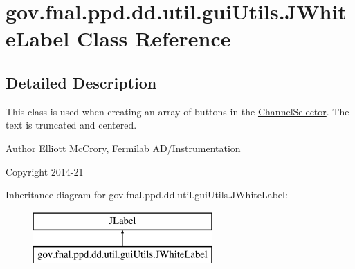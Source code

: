 \hypertarget{classgov_1_1fnal_1_1ppd_1_1dd_1_1util_1_1guiUtils_1_1JWhiteLabel}{\section{gov.\-fnal.\-ppd.\-dd.\-util.\-gui\-Utils.\-J\-White\-Label Class Reference}
\label{classgov_1_1fnal_1_1ppd_1_1dd_1_1util_1_1guiUtils_1_1JWhiteLabel}
}


\subsection{Detailed Description}
This class is used when creating an array of buttons in the \hyperlink{classgov_1_1fnal_1_1ppd_1_1dd_1_1ChannelSelector}{Channel\-Selector}. The text is truncated and centered.

\begin{DoxyAuthor}{Author}
Elliott Mc\-Crory, Fermilab A\-D/\-Instrumentation 
\end{DoxyAuthor}
\begin{DoxyCopyright}{Copyright}
2014-\/21 
\end{DoxyCopyright}
Inheritance diagram for gov.\-fnal.\-ppd.\-dd.\-util.\-gui\-Utils.\-J\-White\-Label\-:\begin{figure}[H]
\begin{center}
\leavevmode
\includegraphics[height=2.000000cm]{classgov_1_1fnal_1_1ppd_1_1dd_1_1util_1_1guiUtils_1_1JWhiteLabel}
\end{center}
\end{figure}
